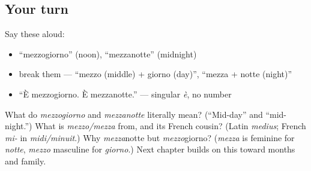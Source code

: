 \subsection*{Your turn}
Say these aloud:

\begin{itemize}
\raggedright
  \item \textquotedblleft{}mezzogiorno\textquotedblright{} (noon), \textquotedblleft{}mezzanotte\textquotedblright{} (midnight)
  \item break them — \textquotedblleft{}mezzo (middle) + giorno (day)\textquotedblright{}, \textquotedblleft{}mezza + notte (night)\textquotedblright{}
  \item \textquotedblleft{}È mezzogiorno. È mezzanotte.\textquotedblright{} — singular \emph{è}, no number
\end{itemize}

\begin{tcolorbox}[breakable,colback=teal!4,colframe=teal!35!black,title={Before you move on}]
What do \emph{mezzogiorno} and \emph{mezzanotte} literally mean? (\textquotedblleft{}Mid-day\textquotedblright{} and \textquotedblleft{}mid-night.\textquotedblright{}) What is \emph{mezzo/mezza} from, and its French cousin? (Latin \emph{medius}; French \emph{mi-} in \emph{midi/minuit}.) Why \emph{mezza}notte but \emph{mezzo}giorno? (\emph{mezza} is feminine for \emph{notte}, \emph{mezzo} masculine for \emph{giorno}.) Next chapter builds on this toward months and family.
\end{tcolorbox}
